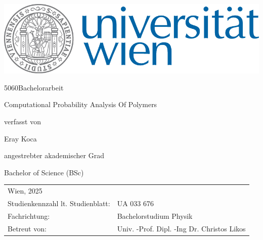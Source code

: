 \documentclass{article}      %
\makeatletter
\newcommand\HUGE{\@setfontsize\Huge{50}{60}}
\makeatother
\begin{document}

 
\thispagestyle{empty}
\begin{center}
\begin{minipage}{0.9\linewidth}
\flushright
	      		 
    \includegraphics[width=0.5\linewidth]{univie.jpg}\par
    \vspace{1.5cm}
\centering 	
	{\scshape{\HUGE Bachelorarbeit\par}}
	\vspace{1cm}
    {\scshape{\Large Computational Probability Analysis Of Polymers \par}}
    \vspace{2cm}
    
  
 verfasst von  \linebreak
 {\Large Eray Koca\par}
 	\vspace{1.5cm}
angestrebter akademischer Grad\linebreak
 {\Large Bachelor of Science (BSc)\par}
	\vspace{1.5cm}

\flushleft
	

\begin{tabular}{ll}
Wien, 2025	\linebreak
\vspace{1cm}&   \\
  Studienkennzahl lt. Studienblatt: & UA 033 676 \vspace{0.3cm} \\ 
  Fachrichtung: & Bachelorstudium Physik \vspace{0.3cm} \\
  Betreut von: &  Univ. -Prof. Dipl. -Ing Dr. Christos Likos\\
 \end{tabular}


    
    
\end{minipage}
\end{center}
\clearpage

\newpage
\end{document}
